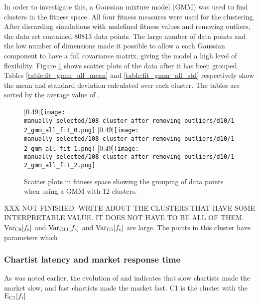 In order to investigate this, a Gaussian mixture model (GMM) was used to find clusters in the fitness space. All four fitness measures were used for the clustering. After discarding simulations with undefined fitness values and removing outliers, the data set contained 80813 data points. The large number of data points and the low number of dimensions made it possible to allow a each Gaussian component to have a full covariance matrix, giving the model a high level of flexibility. Figure \ref{fig:d10_scatter_clusters} shows scatter plots of the data after it has been grouped. Tables \ref{table:fit_gmm_all_mean} and \ref{table:fit_gmm_all_std} respectively show the mean and standard deviation calculated over each cluster. The tables are sorted by the average value of \overshoot.



\begin{figure}
	\centering
	\subcaptionbox{}[0.49\linewidth]{\texttt{[image: manually\_selected/108\_cluster\_after\_removing\_outliers/d10/12\_gmm\_all\_fit\_0.png]}}
	\subcaptionbox{}[0.49\linewidth]{\texttt{[image: manually\_selected/108\_cluster\_after\_removing\_outliers/d10/12\_gmm\_all\_fit\_1.png]}}
	\subcaptionbox{}[0.49\linewidth]{\texttt{[image: manually\_selected/108\_cluster\_after\_removing\_outliers/d10/12\_gmm\_all\_fit\_2.png]}}
	\caption{Scatter plots in fitness space showing the grouping of data points when using a GMM with 12 clusters.}
	\label{fig:d10_scatter_clusters}
\end{figure}

XXX NOT FINISHED. WRITE ABOUT THE CLUSTERS THAT HAVE SOME INTERPRETABLE VALUE. IT DOES NOT HAVE TO BE ALL OF THEM.
$\mathrm{Var}_\text{C8}[f_\text{s}]$ and $\mathrm{Var}_\text{C11}[f_\text{s}]$ and $\mathrm{Var}_\text{C5}[f_\text{s}]$ are large. The points in this cluster have parameters which 



\subsubsection*{Chartist latency and market response time}
As was noted earlier, the evolution of \sclatencymu and \timetoreachnewfundamental indicates that slow chartists made the market slow, and fast chartists made the market fast. C1 is the cluster with the $\mathrm{E}_\text{C{1}}[f_\text{t}]$

